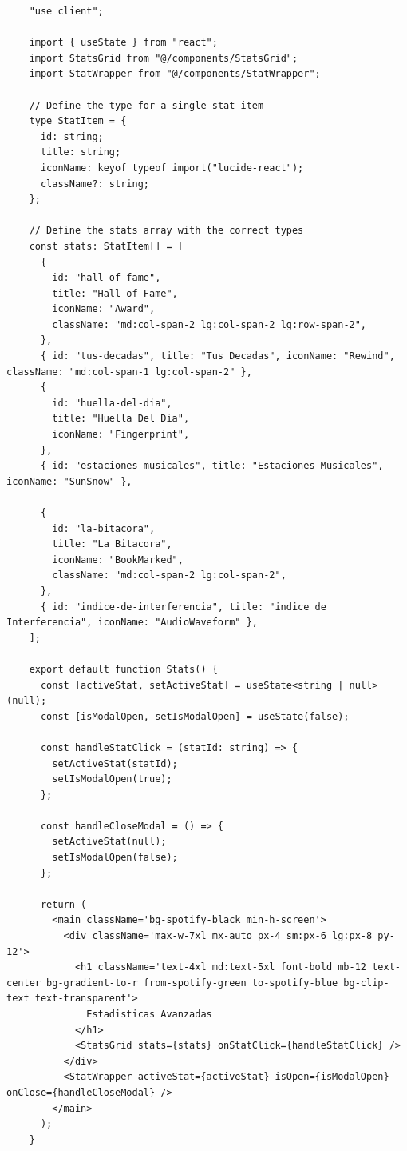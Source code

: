 \begin{ifalgorithm}[H]
  \begin{lstlisting}
    "use client";

    import { useState } from "react";
    import StatsGrid from "@/components/StatsGrid";
    import StatWrapper from "@/components/StatWrapper";

    // Define the type for a single stat item
    type StatItem = {
      id: string;
      title: string;
      iconName: keyof typeof import("lucide-react");
      className?: string;
    };

    // Define the stats array with the correct types
    const stats: StatItem[] = [
      {
        id: "hall-of-fame",
        title: "Hall of Fame",
        iconName: "Award",
        className: "md:col-span-2 lg:col-span-2 lg:row-span-2",
      },
      { id: "tus-decadas", title: "Tus Decadas", iconName: "Rewind", className: "md:col-span-1 lg:col-span-2" },
      {
        id: "huella-del-dia",
        title: "Huella Del Dia",
        iconName: "Fingerprint",
      },
      { id: "estaciones-musicales", title: "Estaciones Musicales", iconName: "SunSnow" },

      {
        id: "la-bitacora",
        title: "La Bitacora",
        iconName: "BookMarked",
        className: "md:col-span-2 lg:col-span-2",
      },
      { id: "indice-de-interferencia", title: "indice de Interferencia", iconName: "AudioWaveform" },
    ];

    export default function Stats() {
      const [activeStat, setActiveStat] = useState<string | null>(null);
      const [isModalOpen, setIsModalOpen] = useState(false);

      const handleStatClick = (statId: string) => {
        setActiveStat(statId);
        setIsModalOpen(true);
      };

      const handleCloseModal = () => {
        setActiveStat(null);
        setIsModalOpen(false);
      };

      return (
        <main className='bg-spotify-black min-h-screen'>
          <div className='max-w-7xl mx-auto px-4 sm:px-6 lg:px-8 py-12'>
            <h1 className='text-4xl md:text-5xl font-bold mb-12 text-center bg-gradient-to-r from-spotify-green to-spotify-blue bg-clip-text text-transparent'>
              Estadisticas Avanzadas
            </h1>
            <StatsGrid stats={stats} onStatClick={handleStatClick} />
          </div>
          <StatWrapper activeStat={activeStat} isOpen={isModalOpen} onClose={handleCloseModal} />
        </main>
      );
    }
    \end{lstlisting}
  \caption{Definición del componente \texttt{Stats}, encargado de gestionar y renderizar la interfaz de las estadísticas avanzadas.}
  \label{alg:stats_component}
\end{ifalgorithm}

